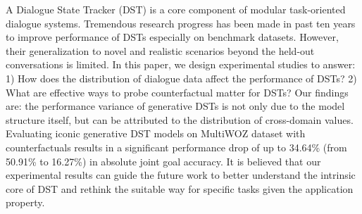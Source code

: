 A Dialogue State Tracker (DST) is a core component of modular task-oriented dialogue systems. Tremendous research progress has been made in past ten years to improve performance of DSTs especially on benchmark datasets. However, their generalization to novel and realistic scenarios beyond the held-out conversations is limited. In this paper, we design experimental studies to answer: 1) How does the distribution of dialogue data affect the performance of DSTs? 2) What are effective ways to probe counterfactual matter for DSTs? Our findings are: the performance variance of generative DSTs is not only due to the model structure itself, but can be attributed to the distribution of cross-domain values. Evaluating iconic generative DST models on MultiWOZ dataset with counterfactuals results in a significant performance drop of up to 34.64\% (from 50.91\% to 16.27\%) in absolute joint goal accuracy. It is believed that our experimental results can guide the future work to better understand the intrinsic core of DST and rethink the suitable way for specific tasks given the application property.
